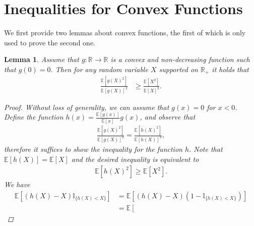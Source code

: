 \documentclass[letter, 12pt]{report}
\newcommand{\R}{\mathbb R}
\newcommand{\E}{\mathbb E}
\newcommand{\1}{\mathbf{1}}
\newcommand{\mI}{\mathbb{I}}
\theoremstyle{plain}
\newtheorem{lemma}[theorem]{Lemma}
\theoremstyle{definition}
\theoremstyle{remark}
\begin{document}
\section{Inequalities for Convex Functions}
We first provide two
lemmas about convex functions,
the first of which is only used to prove the second one.
\begin{lemma}
    \label{lem:concave}
    Assume that $g: \R \to \R$ is a convex and non-decreasing function
    such that $g(0) = 0$.
    Then for any random variable $X$ supported on $\R_+$
    it holds that
    \begin{align*}
        \frac{
            \E[g(X)^2]
        }{
            \E[g(X)]^2
        }
         & \geq
        \frac{
            \E[X^2]
        }{
            \E[X]^2
        }.
    \end{align*}
    \begin{proof}
        Without loss of generality, we can assume that $g(x) = 0$ for $x < 0$.
        Define the function
        $h(x) = \frac{\E[g(x)]}{\E[x]}g(x)$,
        and observe that
        \begin{align*}
            \frac{
                \E[g(X)^2]
            }{
                \E[g(X)]^2
            }
            =
            \frac{
                \E[h(X)^2]
            }{
                \E[h(X)]^2
            },
        \end{align*}
        therefore it suffices to show the inequality
        for the function $h$.
        Note that $\E[h(X)] = \E[X]$
        and the desired inequality is equivalent to
        \begin{align*}
            \E[h(X)^2]
            \geq
            \E[X^2].
        \end{align*}
        We have
        \begin{align*}
            \E\left[
                (h(X) - X)
                \mI_{\{h(X) < X\}}
                \right]
             & =
            \E\left[
                (h(X) - X)
                (1 - \mI_{\{h(X) < X\}})
                \right]
            \\
             & =
            \E\left[

\end{align*}
\end{proof}
\end{lemma}
\end{document}
